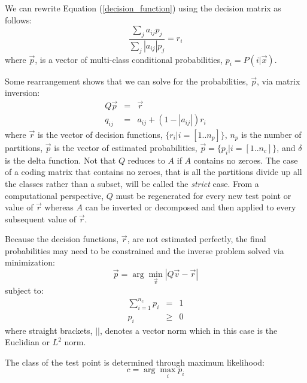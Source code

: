 \documentclass{article}
\begin{document}
We can rewrite Equation (\ref{decision_function}) using the decision
matrix as follows:
\begin{equation}
	\frac{\sum_j a_{ij} p_j}{\sum_j |a_{ij}| p_j} = r_i
\end{equation}
where $\vec p$, is a vector of multi-class conditional probabilities, $p_i=P(i|\vec x)$.

Some rearrangement shows that
we can solve for the probabilities, $\vec p$, via matrix inversion:
\begin{eqnarray}
	Q \vec p & = & \vec r \label{basic_system}\\
	q_{ij} & = & a_{ij} + (1-|a_{ij}|) r_i 
	\label{matrix_inverse2}
\end{eqnarray}
where $\vec r$ is the vector of decision functions, $\lbrace r_i| i=[1..n_p]\rbrace$, $n_p$ is the number of partitions,
$\vec p$ is the vector of estimated probabilities, $\vec p =\lbrace p_i | i=[1..n_c]\rbrace$, and $\delta$ is the delta function.
Not that $Q$ reduces to $A$ if $A$ contains no zeroes.
The case of a coding matrix that contains no zeroes, that is all the partitions divide up all the
classes rather than a subset, will be called the {\it strict} case.
From a computational perspective, 
$Q$ must be regenerated for every new test point or value of $\vec r$ 
whereas $A$ can be inverted or decomposed and then
applied to every subsequent value of $\vec r$.

Because the decision functions, $\vec r$, are not estimated perfectly,
the final probabilities may need to be constrained and the inverse
problem solved via minimization:
\begin{equation}
	\vec p = \arg \min_{\vec v} | Q \vec v - \vec r | \label{minimization_problem}
\end{equation}
subject to:
\begin{eqnarray}
	\sum_{i=1}^{n_c} p_i & = & 1 \label{first_constraint}\\
	p_i & \ge & 0 
\end{eqnarray}
where straight brackets, $||$, denotes a vector norm which  
in this case is the Euclidian or $L^2$ norm.

The class of the test point is determined through maximum likelihood:
\begin{equation}
	c = \arg \max_i p_i
\end{equation}
\end{document}
